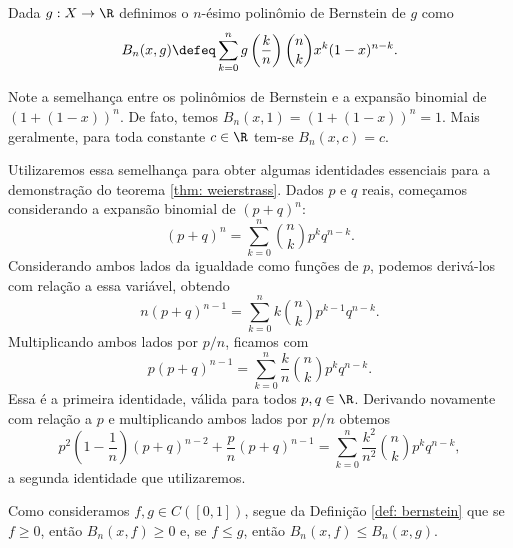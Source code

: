 \begin{defn}
    \label{def: bernstein}
    Dada \( g : X \to \R \) definimos o \( n \)-ésimo polinômio de Bernstein de \( g \) como
    \begin{equation}
        B_{ n }(x, g) \defeq
        \sum_{ k=0 }^{ n } g \left( \frac{ k }{ n } \right) \binom{n}{k} x^{ k } ( 1 - x )^{ n - k }
        \label{eq: bernstein}
    .\end{equation}
\end{defn}

Note a semelhança entre os polinômios de Bernstein e a expansão binomial de \( ( 1 + ( 1 - x ) )^{ n } \).
De fato, temos \( B_{ n } (x, 1) = ( 1 + ( 1 - x ) )^{ n } = 1 \).
Mais geralmente, para toda constante \( c \in \R \) tem-se \( B_{ n } (x, c) = c \).

Utilizaremos essa semelhança para obter algumas identidades essenciais para a demonstração do teorema \ref{thm: weierstrass}.
Dados \( p \) e \( q \) reais, começamos considerando a expansão binomial de \( ( p + q )^{ n } \):
\begin{equation}
    ( p + q )^{ n } =
    \sum_{ k=0 }^{ n } \binom{n}{k} p^{ k } q^{ n-k }
.\end{equation}
Considerando ambos lados da igualdade como funções de \( p \), podemos derivá-los com relação a essa variável, obtendo 
\begin{equation}
    n ( p + q )^{ n-1 } =
    \sum_{ k=0 }^{ n } k \binom{n}{k} p^{ k-1 } q^{ n-k }
.\end{equation}
Multiplicando ambos lados por \( p/n \), ficamos com
    \begin{equation}
        p ( p + q )^{ n-1 } =
        \sum_{ k=0 }^{ n } \frac{ k }{ n } \binom{n}{k} p^{ k } q^{ n-k }
        \label{eq: id_1}
    .\end{equation}
Essa é a primeira identidade, válida para todos \( p, q \in \R \).
Derivando novamente com relação a \( p \) e multiplicando ambos lados por \( p/n \) obtemos
\begin{equation}
    p^2 \left( 1 - \frac{ 1 }{ n } \right) ( p + q )^{ n-2 } + \frac{ p }{ n } ( p + q )^{ n-1 } =
    \sum_{ k=0 }^{ n } \frac{ k^2 }{ n^2 } \binom{n}{k} p^{ k } q^{ n-k }
    \label{eq: id_2}
,\end{equation}
a segunda identidade que utilizaremos.


Como consideramos \( f, g \in C([0, 1]) \), segue da Definição \ref{def: bernstein} que se \( f \geq 0 \), então \( B_{ n } (x, f) \geq 0 \) e, se \( f \leq g \), então \( B_{ n } (x, f) \leq B_{ n } (x, g) \).

